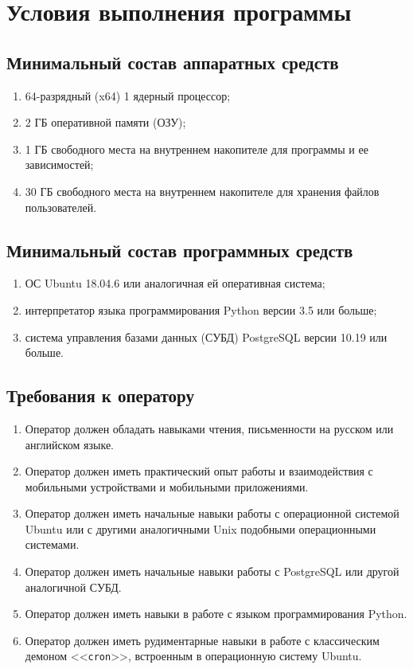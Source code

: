 \documentclass[a4paper,12pt]{article}
\begin{document}
  \newpage
  \section{Условия выполнения программы}
  \subsection{Минимальный состав аппаратных средств}
  \begin{enumerate}
    \item 64-разрядный (x64) 1 ядерный процессор;
    \item 2 ГБ оперативной памяти (ОЗУ);
    \item 1 ГБ свободного места на внутреннем накопителе для программы и ее зависимостей;
    \item 30 ГБ свободного места на внутреннем накопителе для хранения файлов пользователей.
  \end{enumerate}

  \subsection{Минимальный состав программных средств}
  \begin{enumerate}
    \item ОС Ubuntu 18.04.6 или аналогичная ей оперативная система;
    \item интерпретатор языка программирования Python версии 3.5 или больше;
    \item система управления базами данных (СУБД) PostgreSQL версии 10.19 или больше.
  \end{enumerate}

  \subsection{Требования к оператору} %
  \begin{enumerate}
    \item Оператор должен обладать навыками чтения, письменности на русском или английском языке.
    \item Оператор должен иметь практический опыт работы и взаимодействия с мобильными устройствами и мобильными приложениями.
    \item Оператор должен иметь начальные навыки работы с операционной системой Ubuntu или с другими аналогичными Unix подобными операционными системами.
    \item Оператор должен иметь начальные навыки работы с PostgreSQL или другой аналогичной СУБД.
    \item Оператор должен иметь навыки в работе с языком программирования Python.
    \item Оператор должен иметь рудиментарные навыки в работе с классическим демоном <<\texttt{cron}>>, встроенным в операционную систему Ubuntu.
  \end{enumerate}
\end{document}
